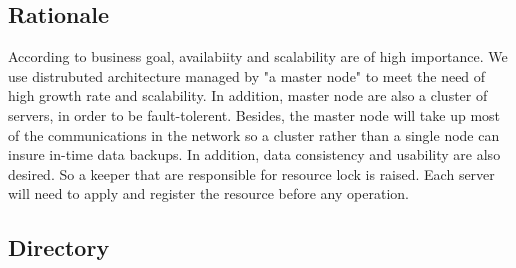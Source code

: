 \documentclass{article}
\begin{document}
	\subsection{Rationale}
	According to business goal, availabiity and scalability are of high importance. We use distrubuted architecture managed by "a master node" to meet the need of high growth rate  and scalability. In addition, master node are also a  cluster of servers, in order to be fault-tolerent. Besides, the master node will take up most of the communications in the network so a cluster rather than a single node can insure in-time data backups.
	In addition, data consistency and usability are also desired. So a keeper that are responsible for resource lock is raised. Each server will need to apply and register the resource before any operation.

	\subsection{Directory}
\end{document}
